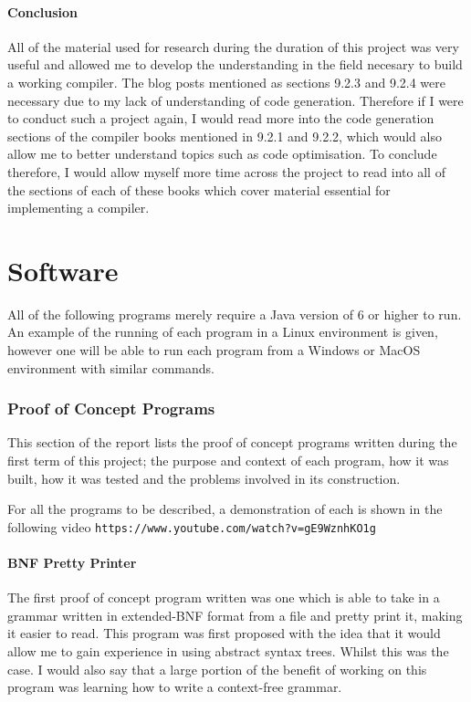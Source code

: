 \documentclass[a4paper, 11pt]{article}
\begin{document}
\subsection{Conclusion}
All of the material used for research during the duration of this project was very useful and allowed me to develop the understanding in the field necesary to build a working compiler. The blog posts mentioned as sections 9.2.3 and 9.2.4 were necessary due to my lack of understanding of code generation. Therefore if I were to conduct such a project again, I would read more into the code generation sections of the compiler books mentioned in 9.2.1 and 9.2.2, which would also allow me to better understand topics such as code optimisation. To conclude therefore, I would allow myself more time across the project to read into all of the sections of each of these books which cover material essential for implementing a compiler.

\newpage\part{Software}
All of the following programs merely require a Java version of 6 or higher to run. An example of the running of each program in a Linux environment is given, however one will be able to run each program from a Windows or MacOS environment with similar commands. 

\section{Proof of Concept Programs}
This section of the report lists the proof of concept programs written during the first term of this project; the purpose and context of each program, how it was built, how it was tested and the problems involved in its construction.

For all the programs to be described, a demonstration of each is shown in the following video \texttt{https://www.youtube.com/watch?v=gE9WznhKO1g}

\subsection{BNF Pretty Printer}
The first proof of concept program written was one which is able to take in a grammar written in extended-BNF format from a file and pretty print it, making it easier to read. This program was first proposed with the idea that it would allow me to gain experience in using abstract syntax trees. Whilst this was the case. I would also say that a large portion of the benefit of working on this program was learning how to write a context-free grammar.
\end{document}
